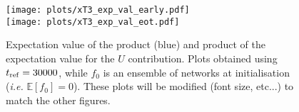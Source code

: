 


\begin{figure}[t!]
  \label{fig:xT3_exp_val}
  \centering
  \texttt{[image: plots/xT3\_exp\_val\_early.pdf]} \\
  \texttt{[image: plots/xT3\_exp\_val\_eot.pdf]}
  \caption{Expectation value of the product (blue) and product of the
  expectation value for the $U$ contribution. Plots obtained using $t_{\rm ref}
  = 30000$, while $f_0$ is an ensemble of networks at initialisation
  (\textit{i.e.} $\mathbb{E}[f_0]=0$). \ac{These plots will be modified (font
  size, etc...) to match the other figures.}}
\end{figure}
